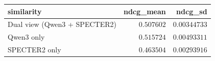 \begin{tabular}{lrr}
\toprule
similarity & ndcg\_mean & ndcg\_sd \\
\midrule
Dual view (Qwen3 + SPECTER2) & $0.507602$ & $0.00344733$ \\
Qwen3 only & $0.515724$ & $0.00493311$ \\
SPECTER2 only & $0.463504$ & $0.00293916$ \\
\bottomrule
\end{tabular}
